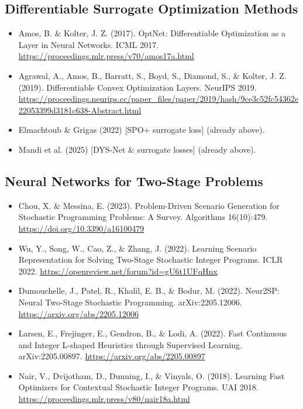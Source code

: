 \documentclass[11pt]{article}
\begin{document}
\subsection*{Differentiable Surrogate Optimization Methods}
\begin{itemize}
  \item Amos, B. \& Kolter, J. Z. (2017). OptNet: Differentiable Optimization as a Layer in Neural Networks. ICML 2017. \url{https://proceedings.mlr.press/v70/amos17a.html}
  \item Agrawal, A., Amos, B., Barratt, S., Boyd, S., Diamond, S., \& Kolter, J. Z. (2019). Differentiable Convex Optimization Layers. NeurIPS 2019. \url{https://proceedings.neurips.cc/paper_files/paper/2019/hash/9ce3c52fc54362e22053399d3181c638-Abstract.html}
  \item Elmachtoub \& Grigas (2022) [SPO+ surrogate loss] (already above).
  \item Mandi et al. (2025) [DYS-Net \& surrogate losses] (already above).
\end{itemize}

\subsection*{Neural Networks for Two-Stage Problems}
\begin{itemize}
  \item Chou, X. \& Messina, E. (2023). Problem-Driven Scenario Generation for Stochastic Programming Problems: A Survey. Algorithms 16(10):479. \url{https://doi.org/10.3390/a16100479}
  \item Wu, Y., Song, W., Cao, Z., \& Zhang, J. (2022). Learning Scenario Representation for Solving Two-Stage Stochastic Integer Programs. ICLR 2022. \url{https://openreview.net/forum?id=gU6t1UFqHnx}
  \item Dumouchelle, J., Patel, R., Khalil, E. B., \& Bodur, M. (2022). Neur2SP: Neural Two-Stage Stochastic Programming. arXiv:2205.12006. \url{https://arxiv.org/abs/2205.12006}
  \item Larsen, E., Frejinger, E., Gendron, B., \& Lodi, A. (2022). Fast Continuous and Integer L-shaped Heuristics through Supervised Learning. arXiv:2205.00897. \url{https://arxiv.org/abs/2205.00897}
  \item Nair, V., Dvijotham, D., Dunning, I., \& Vinyals, O. (2018). Learning Fast Optimizers for Contextual Stochastic Integer Programs. UAI 2018. \url{https://proceedings.mlr.press/v80/nair18a.html}
\end{itemize}
\end{document}

